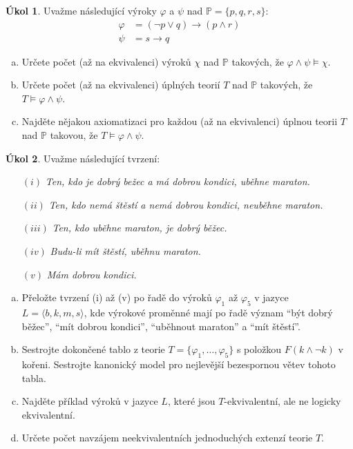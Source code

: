 \documentclass[a4paper]{amsart}
\theoremstyle{definition}
\newtheorem{task}{Úkol}
\begin{document}
\begin{task}
Uvažme následující výroky $\varphi$ a $\psi$ nad $\mathbb P=\{p, q, r, s\}$:
\begin{align*}
    \varphi &= (\neg p \vee  q)\to(p\wedge r)\\
    \psi &= s\to q
\end{align*}
\begin{enumerate}[(a)]
    \item Určete počet (až na ekvivalenci) výroků $\chi$ nad $\mathbb P$ takových, že $\varphi\wedge\psi\models\chi$.
    \item Určete počet (až na ekvivalenci) úplných teorií $T$ nad $\mathbb P$ takových, že $T\models\varphi\wedge\psi$.
    \item Najděte nějakou axiomatizaci pro každou (až na ekvivalenci) úplnou teorii $T$ nad $\mathbb P$ takovou, že $T\models\varphi\wedge\psi$.
\end{enumerate}


\end{task}


\begin{task}
Uvažme následující tvrzení:
\begin{enumerate}
\item[$(i)$] {\it Ten, kdo je dobrý bežec a má dobrou kondici, uběhne maraton.}
\item[$(ii)$] {\it Ten, kdo nemá štěstí a nemá dobrou kondici, neuběhne maraton.}
\item[$(iii)$]{\it Ten, kdo uběhne maraton, je dobrý běžec.}
\item[$(iv)$] {\it Budu-li mít štěstí, uběhnu maraton.}
\item[$(v)$] {\it Mám dobrou kondici.}
\end{enumerate}


\begin{enumerate}[(a)]
\item Přeložte tvrzení (i) až (v) po řadě do výroků $\varphi_1$ až $\varphi_5$ v jazyce $L=\langle b, k, m, s\rangle$, kde výrokové proměnné mají po řadě význam ``být dobrý běžec'', ``mít dobrou kondici'', ``uběhnout maraton'' a ``mít štěstí''.
\item Sestrojte dokončené tablo z teorie $T=\{\varphi_1,\dots,\varphi_5\}$ s položkou $F (k \wedge \neg k)$ v kořeni. Sestrojte kanonický model pro nejlevější bezespornou větev tohoto tabla.

\item Najděte příklad výroků v jazyce $L$, které jsou $T$-ekvivalentní, ale ne logicky ekvivalentní. 
\item Určete počet navzájem neekvivalentních jednoduchých extenzí teorie $T$.
\end{enumerate}
\end{task}
\end{document}
